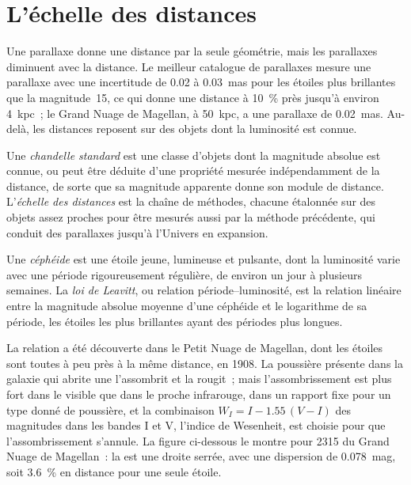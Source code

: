 \section{L'échelle des distances}\label{sec:b3:milky-way-galaxies:ladder}

Une parallaxe donne une distance par la seule géométrie, mais les parallaxes diminuent
avec la distance. Le meilleur catalogue de parallaxes mesure une parallaxe avec une
incertitude de 0.02 à \qty{0.03}{mas} pour les étoiles plus brillantes que la
magnitude~15, ce qui donne une distance à \qty{10}{\percent} près jusqu'à environ
\qty{4}{kpc}~; le Grand Nuage de Magellan, à \qty{50}{kpc}, a une
parallaxe de \qty{0.02}{mas}. Au-delà, les distances reposent sur des objets dont la
luminosité est connue.

\begin{definition}\label{def:b3:milky-way-galaxies:ladder}
Une \emph{chandelle standard} est une classe d'objets
dont la magnitude absolue est connue, ou peut être déduite d'une propriété
mesurée indépendamment de la distance, de sorte que sa magnitude apparente donne
son module de distance. L'\emph{échelle des distances} est
la chaîne de méthodes, chacune étalonnée sur des objets assez proches pour être
mesurés aussi par la méthode précédente, qui conduit des parallaxes jusqu'à
l'Univers en expansion.
\end{definition}

\begin{definition}\label{def:b3:milky-way-galaxies:cepheid}
Une \emph{céphéide} est une étoile jeune, lumineuse et pulsante,
dont la luminosité varie avec une période rigoureusement régulière,
de environ un jour à plusieurs semaines. La \emph{loi de Leavitt},
ou relation période--luminosité, est la relation linéaire entre la magnitude
absolue moyenne d'une céphéide et le logarithme de sa période, les étoiles les
plus brillantes ayant des périodes plus longues.
\end{definition}

La relation a été découverte dans le Petit Nuage de Magellan, dont les étoiles
sont toutes à peu près à la même distance, en 1908. La poussière présente dans la galaxie qui
abrite une  l'assombrit et la rougit~; mais l'assombrissement est plus fort
dans le visible que dans le proche infrarouge, dans un rapport fixe pour un type donné de
poussière, et la combinaison $W_I = I - 1.55\,(V - I)$ des magnitudes dans
les bandes I et V, l'indice de Wesenheit, est choisie pour que l'assombrissement
s'annule. La figure ci-dessous le montre pour 2315  du Grand Nuage de Magellan~: la  est une droite serrée, avec une dispersion de
\qty{0.078}{mag}, soit \qty{3.6}{\percent} en distance pour une seule
étoile.

